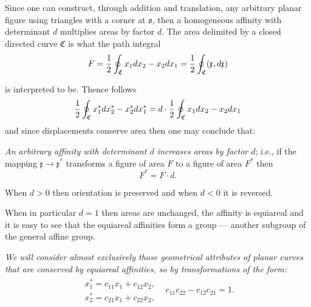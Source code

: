 \documentclass[11pt]{book} \usepackage{amssymb}
\newcommand{\myvec}[1]{\mathfrak{#1}}
\begin{document}
Since one can construct, through addition and translation, any arbitrary planar 
figure using triangles with a corner at $\myvec{o}$, then a homogeneous 
affinity with determinant $d$ multiplies areas by factor $d$.
The area delimited by a closed directed curve $\mathfrak{C}$ is what the path
integral
\begin{equation}
  \label{eq:curve_area}
  F={1\over 2}\oint_\mathfrak{C}x_1dx_2-x_2dx_1
  ={1\over 2}\oint_\mathfrak{C}(\myvec{x},d\myvec{x})
\end{equation}
\begin{figure}[htp]
  \begin{center}
  \end{center}
  \caption{}
\end{figure}
is interpreted to be. Thence follows
\begin{equation}
  \label{eq:area_transformation}
  {1\over 2}\oint_\mathfrak{C}x^*_1dx^*_2-x^*_2dx^*_1
  =d\cdot{1\over 2}\oint_\mathfrak{C}x_1dx_2-x_2dx_1
\end{equation}
and since displacements conserve area then one may conclude that:

{\em An arbitrary affinity with determinant $d$ increases areas by factor $d$};
i.e., if the mapping $\myvec{x}\to\myvec{x}^*$ transforms a figure of area $F$
to a figure of area $F^*$ then
\begin{equation}
  \label{eq:area_transform2}
  F^*=F\cdot d.
\end{equation}

When $d>0$ then orientation is preserved and when $d<0$ it is reversed.

When in particular $d=1$ then areas are unchanged, the affinity is equiareal
and it is easy to see that the equiareal affinities form a group --- another
subgroup of the general affine group.

{\em We will consider almost exclusively those geometrical attributes of
planar curves that are conserved by equiareal affinities, so by transformations
of the form:}
\begin{equation}
  \label{eq:equiareal_affinities}
  \begin{array}{ll}
    \begin{array}{l}
      x_1^*=c_{11}x_1+c_{12}x_2,\\
      x_2^*=c_{21}x_1+c_{22}x_2,
    \end{array}
    & c_{11}c_{22}-c_{12}c_{21}=1.
  \end{array}
\end{equation}
\end{document}
